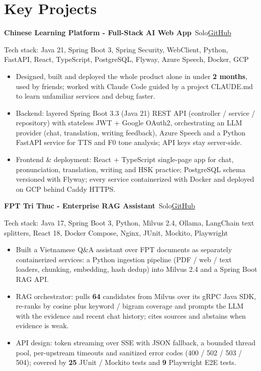\documentclass[10pt, a4paper]{article}
\newcommand{\project}[3]{\textbf{#1}\,{\color{MutedText}\textbar{} #2}\hfill\href{#3}{GitHub}\par}
\newcommand{\techstack}[1]{{\color{MutedText}Tech stack: #1}\par}
\begin{document}
\section{Key Projects}
\project{Chinese Learning Platform - Full-Stack AI Web App}{Solo}{https://github.com/minhphuong150505/Web_Chinese_Learning-}
\techstack{Java 21, Spring Boot 3, Spring Security, WebClient, Python, FastAPI, React, TypeScript, PostgreSQL, Flyway, Azure Speech, Docker, GCP}
\begin{itemize}
  \item Designed, built and deployed the whole product alone in under \textbf{2 months}, used by friends; worked with Claude Code guided by a project CLAUDE.md to learn unfamiliar services and debug faster.
  \item Backend: layered Spring Boot 3.3 (Java 21) REST API (controller / service / repository) with stateless JWT + Google OAuth2, orchestrating an LLM provider (chat, translation, writing feedback), Azure Speech and a Python FastAPI service for TTS and F0 tone analysis; API keys stay server-side.
  \item Frontend \& deployment: React + TypeScript single-page app for chat, pronunciation, translation, writing and HSK practice; PostgreSQL schema versioned with Flyway; every service containerized with Docker and deployed on GCP behind Caddy HTTPS.
\end{itemize}
\vspace{2pt}
\project{FPT Tri Thuc - Enterprise RAG Assistant}{Solo}{https://github.com/minhphuong150505/milvus-rag-demo}
\techstack{Java 17, Spring Boot 3, Python, Milvus 2.4, Ollama, LangChain text splitters, React 18, Docker Compose, Nginx, JUnit, Mockito, Playwright}
\begin{itemize}
  \item Built a Vietnamese Q\&A assistant over FPT documents as separately containerized services: a Python ingestion pipeline (PDF / web / text loaders, chunking, embedding, hash dedup) into Milvus 2.4 and a Spring Boot RAG API.
  \item RAG orchestrator: pulls \textbf{64} candidates from Milvus over its gRPC Java SDK, re-ranks by cosine plus keyword / bigram coverage and prompts the LLM with the evidence and recent chat history; cites sources and abstains when evidence is weak.
  \item API design: token streaming over SSE with JSON fallback, a bounded thread pool, per-upstream timeouts and sanitized error codes (400 / 502 / 503 / 504); covered by \textbf{25} JUnit / Mockito tests and \textbf{9} Playwright E2E tests.
\end{itemize}
\end{document}
